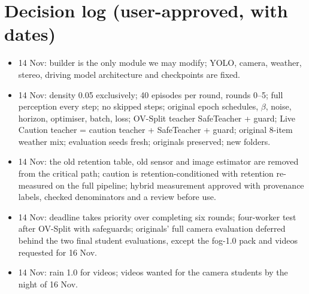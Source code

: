 \documentclass[11pt,a4paper]{article}
\begin{document}
\section{Decision log (user-approved, with dates)}
\begin{itemize}[leftmargin=*]
\item 14 Nov: builder is the only module we may modify; YOLO, camera, weather, stereo, driving model architecture and checkpoints are fixed.
\item 14 Nov: density 0.05 exclusively; 40 episodes per round, rounds 0--5; full perception every step; no skipped steps; original epoch schedules, $\beta$, noise, horizon, optimiser, batch, loss; OV-Split teacher SafeTeacher + guard; Live Caution teacher = caution teacher + SafeTeacher + guard; original 8-item weather mix; evaluation seeds fresh; originals preserved; new folders.
\item 14 Nov: the old retention table, old sensor and image estimator are removed from the critical path; caution is retention-conditioned with retention re-measured on the full pipeline; hybrid measurement approved with provenance labels, checked denominators and a review before use.
\item 14 Nov: deadline takes priority over completing six rounds; four-worker test after OV-Split with safeguards; originals' full camera evaluation deferred behind the two final student evaluations, except the fog-1.0 pack and videos requested for 16 Nov.
\item 14 Nov: rain 1.0 for videos; videos wanted for the camera students by the night of 16 Nov.
\end{itemize}
\end{document}
